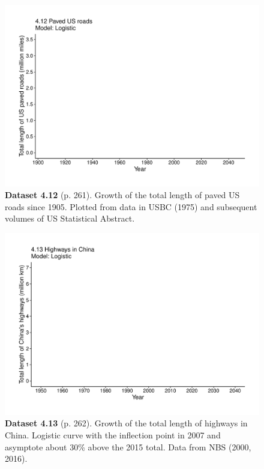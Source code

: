\documentclass[aps,rmp,preprint,superscriptaddress,10pt,onecolumn]{article}
\begin{document}
\clearpage
\begin{figure}[h]
\includegraphics[width=\textwidth]{output/figs-ggplot/4.12.pdf}
\caption*{\textbf{Dataset 4.12} (p. 261). Growth of the total length of paved US roads since 1905. Plotted from data in USBC (1975) and subsequent volumes of US Statistical Abstract.}
\end{figure}
	
\clearpage
\begin{figure}[h]
\includegraphics[width=\textwidth]{output/figs-ggplot/4.13.pdf}
\caption*{\textbf{Dataset 4.13} (p. 262). Growth of the total length of highways in China. Logistic curve with the inflection point in 2007 and asymptote about 30\% above the 2015 total. Data from NBS (2000, 2016).}
\end{figure}
	
\end{document}
